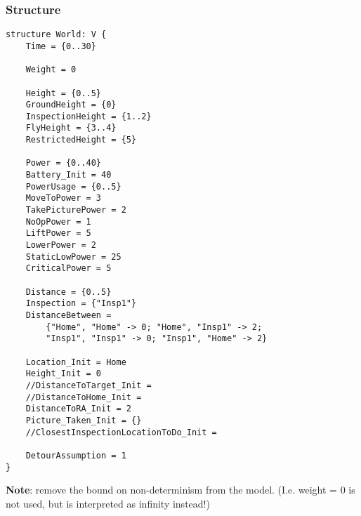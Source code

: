 \documentclass[12pt]{extarticle}
\begin{document}
\subsubsection*{Structure}
\begin{lstlisting}[basicstyle=\tiny]
structure World: V {
    Time = {0..30}
    
    Weight = 0
    
    Height = {0..5}
    GroundHeight = {0}
    InspectionHeight = {1..2}
    FlyHeight = {3..4}
    RestrictedHeight = {5}
    
    Power = {0..40}
    Battery_Init = 40
    PowerUsage = {0..5}
    MoveToPower = 3
    TakePicturePower = 2
    NoOpPower = 1
    LiftPower = 5
    LowerPower = 2
    StaticLowPower = 25
    CriticalPower = 5
    
    Distance = {0..5}
    Inspection = {"Insp1"}
    DistanceBetween =
    	{"Home", "Home" -> 0; "Home", "Insp1" -> 2;
        "Insp1", "Insp1" -> 0; "Insp1", "Home" -> 2}
    
    Location_Init = Home
    Height_Init = 0
    //DistanceToTarget_Init =
    //DistanceToHome_Init =
    DistanceToRA_Init = 2
    Picture_Taken_Init = {}
    //ClosestInspectionLocationToDo_Init =
    
    DetourAssumption = 1
}
\end{lstlisting}

\noindent
\textbf{Note}: remove the bound on non-determinism from the model. (I.e. weight = 0 is not used, but is interpreted as infinity instead!)\\
\end{document}
